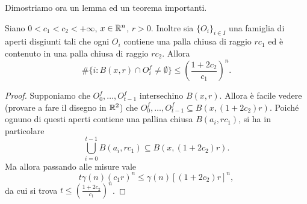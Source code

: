 Dimostriamo ora un lemma ed un teorema importanti. 

\begin{lemma}
	Siano $0<c_{1}<c_{2}<+\infty$, $x\in\mathbb{R}^{n}$, $r>0$. Inoltre sia $\{O_{i}\}_{i\in I}$ una famiglia di aperti disgiunti tali che ogni $O_{i}$ contiene una palla chiusa di raggio $rc_{1}$ ed è contenuto in una palla chiusa di raggio $rc_{2}$.
	Allora $$\#\{i: B(x,r)\cap O_{i}^{f}\neq\emptyset\} \leq \left(\frac{1+2c_{2}}{c_{1}}\right)^{n}.$$
\end{lemma}
\begin{proof}
	Supponiamo che $O_{0}^{f}, \dots, O_{t-1}^{f}$ intersechino $B(x,r)$. Allora è facile vedere (provare a fare il disegno in $\mathbb{R}^{2}$) che $O_{0}^{f},\dots,O_{t-1}^{f}\subseteq B(x, (1+2c_{2})r)$. Poiché ognuno di questi aperti contiene una pallina chiusa $B(a_{i},rc_{1})$, si ha in particolare
	$$\bigcup_{i=0}^{t-1}B(a_{i}, rc_{1}) \subseteq B(x, (1+2c_{2})r).$$ 
	Ma allora passando alle misure vale 
	$$t\gamma(n)(c_{1}r)^{n}\leq \gamma(n)[(1+2c_{2})r]^{n},$$
	da cui si trova $t\leq \left(\frac{1+2c_{2}}{c_{1}}\right)^{n}$.
\end{proof}

